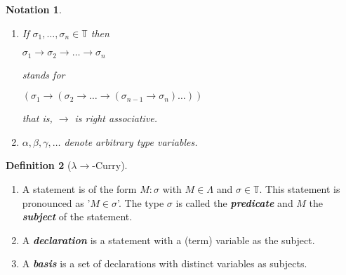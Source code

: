 \documentclass{llncs}
\newcommand{\lambdasystem}[0]{{\lambda}{\rightarrow}}
\newcommand{\myemph}[1]{\textbf{\emph{#1}}}
\theoremstyle{definition}
\newtheorem{mydef}{Definition}
\numberwithin{mydef}{subsection}
\theoremstyle{plain}
\newtheorem{notation}[mydef]{Notation}
\theoremstyle{remark}
\begin{document}
	\begin{notation}
		\begin{enumerate}
			\item If $\sigma _{1}, \dots, \sigma _{n} \in \mathbb{T}$ then
			\begin{center}
				$\sigma _{1} \rightarrow \sigma _{2} \rightarrow \dots \rightarrow \sigma _{n}$
			\end{center}
			stands for
			\begin{center}
				$\left( \sigma _{1} \rightarrow \left( \sigma _{2} \rightarrow \dots \rightarrow \left( \sigma _{n - 1} \rightarrow \sigma _{n} \right) \dots \right) \right)$
			\end{center}
			that is, $\rightarrow$ is right associative.
			\item $\alpha, \beta, \gamma, \dots$ denote arbitrary type variables. \\
		\end{enumerate}
	\end{notation}
	
	\begin{mydef}[$\lambdasystem$-Curry]\label{def:lscurry}
		\begin{enumerate}
			\item A statement is of the form $M : \sigma$ with $M \in \Lambda$ and $\sigma \in \mathbb{T}$.
			This statement is pronounced as '$M \in \sigma$'.
			The type $\sigma$ is called the \myemph{predicate} and $M$ the \myemph{subject} of the statement.
			\item A \myemph{declaration} is a statement with a (term) variable as the subject.
			\item A \myemph{basis} is a set of declarations with distinct variables as subjects. \\
		\end{enumerate}	
	\end{mydef}
	
\end{document}
